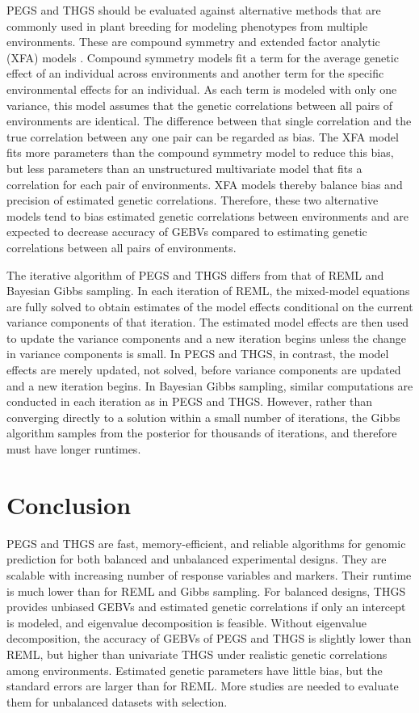\documentclass{bmcart}
\begin{document}
PEGS and THGS should be evaluated against alternative methods that are commonly used in plant breeding for modeling phenotypes from multiple environments. These are compound symmetry and extended factor analytic (XFA) models \cite{MeyerXFA}. Compound symmetry models fit a term for the average genetic effect of an individual across environments and another term for the specific environmental effects for an individual. As each term is modeled with only one variance, this model assumes that the genetic correlations between all pairs of environments are identical. The difference between that single correlation and the true correlation between any one pair can be regarded as bias. The XFA model fits more parameters than the compound symmetry model to reduce this bias, but less parameters than an unstructured multivariate model that fits a correlation for each pair of environments. XFA models thereby balance bias and precision of estimated genetic correlations. Therefore, these two alternative models tend to bias estimated genetic correlations between environments and are expected to decrease accuracy of GEBVs compared to estimating genetic correlations between all pairs of environments.

The iterative algorithm of PEGS and THGS differs from that of REML and Bayesian Gibbs sampling. In each iteration of REML, the mixed-model equations are fully solved to obtain estimates of the model effects conditional on the current variance components of that iteration. The estimated model effects are then used to update the variance components and a new iteration begins unless the change in variance components is small. In PEGS and THGS, in contrast, the model effects are merely updated, not solved, before variance components are updated and a new iteration begins. In Bayesian Gibbs sampling, similar computations are conducted in each iteration as in PEGS and THGS. However, rather than converging directly to a solution within a small number of iterations, the Gibbs algorithm samples from the posterior for thousands of iterations, and therefore must have longer runtimes. 

\section{Conclusion}


PEGS and THGS are fast, memory-efficient, and reliable algorithms for genomic prediction for both balanced and unbalanced experimental designs. They are scalable with increasing number of response variables and markers. Their runtime is much lower than for REML and Gibbs sampling. For balanced designs, THGS provides unbiased GEBVs and estimated genetic correlations if only an intercept is modeled, and eigenvalue decomposition is feasible. Without eigenvalue decomposition, the accuracy of GEBVs of PEGS and THGS is slightly lower than REML, but higher than univariate THGS under realistic genetic correlations among environments. Estimated genetic parameters have little bias, but the standard errors are larger than for REML. More studies are needed to evaluate them for unbalanced datasets with selection. 
\end{document}
